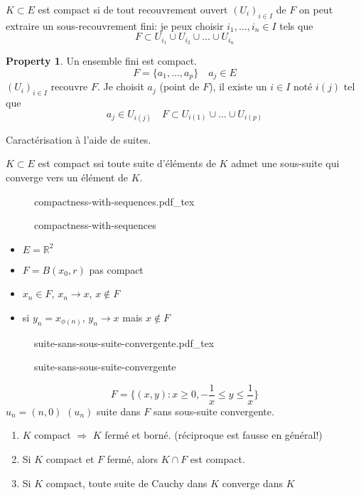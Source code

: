 \documentclass[a4paper]{report}
\newcommand\R{\ensuremath{\mathbb{R}}}
\let\implies\Rightarrow
\theoremstyle{definition}
\newtheorem*{property}{Property}
\newcommand{\incfig}[1]{%
    \def\svgwidth{\columnwidth}
    {#1.pdf_tex}
}
\begin{document}
\begin{definition}
    $K \subset E$ est compact si de tout recouvrement ouvert $(U_i)_{i \in I}$ de $F$ on peut extraire un sous-recouvrement fini: je peux choisir  $i_1, \ldots, i_n \in I$ tels que 
    \[
    F \subset U_{i_1} \cup U_{i_2} \cup \ldots \cup U_{i_n}
    \] 
\end{definition}
\begin{property}
   Un ensemble fini est compact. 
   \[
       F = \{a_1, \ldots, a_p\} \quad a_j \in E
   \] 
   $(U_i)_{i \in I}$ recouvre $F$.
   Je choisit  $a_j$ (point de $F$), il existe un $i \in I$ noté  $i(j)$ tel que 
    \[
   a_j \in U_{i(j)} \quad F \subset U_{i(1)} \cup \ldots \cup U_{i(p)}
   \] 
\end{property}
\begin{theorem}
    Caractérisation à l'aide de suites. \par
    $K \subset E$ est compact ssi toute suite d'éléments de $K$ admet une sous-suite qui converge vers un élément de  $K$.
\end{theorem}
\begin{eg}
    \begin{figure}[H]
        \centering
        \incfig{compactness-with-sequences}
        \caption{compactness-with-sequences}
        \label{fig:compactness-with-sequences}
    \end{figure}
    \begin{itemize}
        \item $E = \R^2$
        \item $F = B(x_0, r)$ pas compact
        \item $x_n \in F$,  $x_n \to x$, $x \not\in F$
        \item si $y_n = x_{\phi(n)}$, $y_n \to x$ mais $x \not\in F$
    \end{itemize}
\end{eg}
\begin{eg}
    
\begin{figure}[H]
    \centering
    \incfig{suite-sans-sous-suite-convergente}
    \caption{suite-sans-sous-suite-convergente}
    \label{fig:suite-sans-sous-suite-convergente}
\end{figure}
\[
    F = \{(x, y): x \ge 0, -\frac{1}{x} \le y \le \frac{1}{x} \}
\] 
$u_n = (n, 0)$  $(u_n)$ suite dans  $F$ sans sous-suite convergente.
\end{eg}

\begin{prop}
    \begin{enumerate}
        \item $K$ compact $\implies$ $K$ fermé et borné. (réciproque est fausse en général!)
        \item Si $K$ compact et $F$ fermé, alors  $K \cap F$ est compact.
        \item Si $K$ compact, toute suite de Cauchy dans  $K$ converge dans  $K$
    \end{enumerate}
\end{prop}
\end{document}
